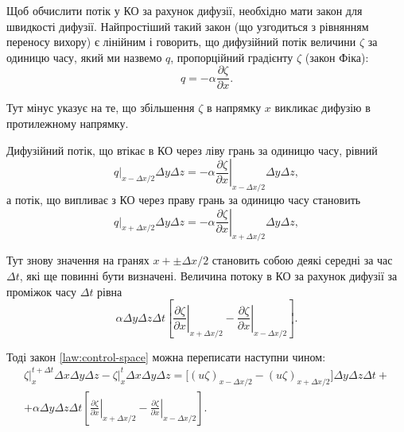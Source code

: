 Щоб обчислити потік у КО за рахунок дифузії, необхідно мати закон для швидкості дифузії. Найпростіший такий закон (що узгодиться з рівнянням переносу вихору) є лінійним і говорить, що дифузійний потік величини $\zeta$ за одиницю часу, який ми назвемо $q$, пропорційний градієнту $\zeta$ (закон Фіка):
\begin{equation*}
    q = - \alpha \frac{\partial \zeta}{\partial x}.
\end{equation*}

Тут мінус указує на те, що збільшення $\zeta$ в напрямку $x$ викликає дифузію в протилежному напрямку. \medskip

Дифузійний потік, що втікає в КО через ліву грань за одиницю часу, рівний
\begin{equation*}
    \left. q \right|_{x - \Delta x / 2} \Delta y \Delta z = - \alpha \left. \frac{\partial \zeta}{\partial x} \right|_{x - \Delta x / 2} \Delta y \Delta z,
\end{equation*}
а потік, що випливає з КО через праву грань за одиницю часу становить
\begin{equation*}
    \left. q \right|_{x + \Delta x / 2} \Delta y \Delta z = - \alpha \left. \frac{\partial \zeta}{\partial x} \right|_{x + \Delta x / 2} \Delta y \Delta z,
\end{equation*}
 
Тут знову значення на гранях $x + \pm \Delta x / 2$ становить собою деякі середні за час $\Delta t$, які ще повинні бути визначені. Величина потоку в КО за рахунок дифузії за проміжок часу $\Delta t$ рівна
\begin{equation*}
    \alpha \Delta y \Delta z \Delta t \left[ \left. \frac{\partial \zeta}{\partial x} \right|_{x + \Delta x / 2} - \left. \frac{\partial \zeta}{\partial x} \right|_{x - \Delta x / 2} \right].
\end{equation*}
 
Тоді закон \ref{law:control-space} можна переписати наступни чином:
\begin{multline}
    \label{eq:3.32}
    \left. \zeta \right|_x^{t + \Delta t} \Delta x \Delta y \Delta z - \left. \zeta \right|_x^t \Delta x \Delta y \Delta z = \Big[ (u \zeta)_{x - \Delta x / 2} - (u \zeta)_{x + \Delta x / 2} \Big] \Delta y \Delta z \Delta t + \\ + \alpha \Delta y \Delta z \Delta t \left[ \left. \frac{\partial \zeta}{\partial x} \right|_{x + \Delta x / 2} - \left. \frac{\partial \zeta}{\partial x} \right|_{x - \Delta x / 2} \right].
\end{multline}

